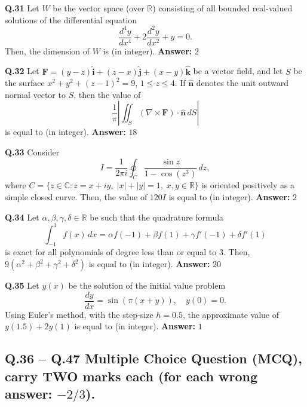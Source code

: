 \documentclass[11pt,a4paper]{article}
\newcommand{\ans}[1]{\textbf{Answer:} #1\par\medskip}
\begin{document}
\textbf{Q.31} Let $W$ be the vector space (over $\mathbb{R}$) consisting of all bounded real-valued solutions of the differential equation
\[
  \frac{d^4 y}{dx^4} + 2\frac{d^2 y}{dx^2} + y = 0.
\]
Then, the dimension of $W$ is \underline{\hspace{2cm}} (in integer).
\ans{$2$}

\textbf{Q.32} Let $\mathbf{F} = (y - z)\hat{\mathbf{i}} + (z - x)\hat{\mathbf{j}} + (x - y)\hat{\mathbf{k}}$ be a vector field, and let $S$ be the surface $x^2 + y^2 + (z - 1)^2 = 9$, $1 \le z \le 4$. If $\hat{\mathbf{n}}$ denotes the unit outward normal vector to $S$, then the value of
\[
  \frac{1}{\pi} \left|\iint_S (\nabla \times \mathbf{F}) \cdot \hat{\mathbf{n}}\,dS\right|
\]
is equal to \underline{\hspace{2cm}} (in integer).
\ans{$18$}

\textbf{Q.33} Consider
\[
  I = \frac{1}{2\pi i} \oint_C \frac{\sin z}{1 - \cos(z^3)}\,dz,
\]
where $C = \{z \in \mathbb{C} : z = x + iy, \; |x| + |y| = 1, \; x, y \in \mathbb{R}\}$ is oriented positively as a simple closed curve. Then, the value of $120I$ is equal to \underline{\hspace{2cm}} (in integer).
\ans{$2$}

\textbf{Q.34} Let $\alpha, \beta, \gamma, \delta \in \mathbb{R}$ be such that the quadrature formula
\[
  \int_{-1}^{1} f(x)\,dx = \alpha f(-1) + \beta f(1) + \gamma f'(-1) + \delta f'(1)
\]
is exact for all polynomials of degree less than or equal to $3$. Then, $9(\alpha^2 + \beta^2 + \gamma^2 + \delta^2)$ is equal to \underline{\hspace{2cm}} (in integer).
\ans{$20$}

\textbf{Q.35} Let $y(x)$ be the solution of the initial value problem
\[
  \frac{dy}{dx} = \sin(\pi(x + y)), \quad y(0) = 0.
\]
Using Euler's method, with the step-size $h = 0.5$, the approximate value of $y(1.5) + 2y(1)$ is equal to \underline{\hspace{2cm}} (in integer).
\ans{$1$}

\subsection*{Q.36 -- Q.47 Multiple Choice Question (MCQ), carry TWO marks each (for each wrong answer: $-2/3$).}
\end{document}
